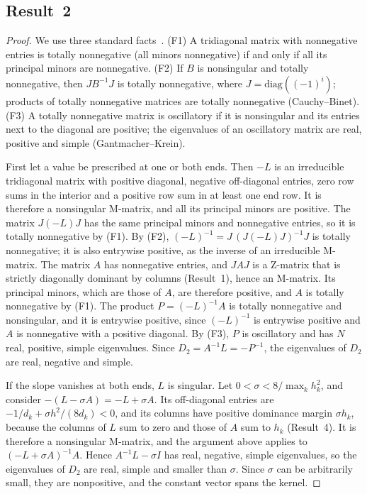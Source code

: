 \documentclass[11pt]{article}
\begin{document}
\subsection*{Result~2}
\begin{proof}
We use three standard facts~\cite{gantmacher2002oscillation,fallat2011totally}. (F1) A tridiagonal matrix
with nonnegative entries is totally nonnegative (all minors nonnegative) if and only if all its principal
minors are nonnegative. (F2) If $B$ is nonsingular and totally nonnegative, then $JB^{-1}J$ is totally
nonnegative, where $J=\mathrm{diag}((-1)^i)$; products of totally nonnegative matrices are totally
nonnegative (Cauchy--Binet). (F3) A totally nonnegative matrix is oscillatory if it is nonsingular and its
entries next to the diagonal are positive; the eigenvalues of an oscillatory matrix are real, positive and
simple (Gantmacher--Krein).

First let a value be prescribed at one or both ends. Then $-L$ is an irreducible tridiagonal matrix with
positive diagonal, negative off-diagonal entries, zero row sums in the interior and a positive row sum
in at least one end row. It is therefore a nonsingular M-matrix, and all its principal minors are positive.
The matrix $J(-L)J$ has the same principal minors and nonnegative entries, so it is totally nonnegative by
(F1). By (F2), $(-L)^{-1}=J\,(J(-L)J)^{-1}J$ is totally nonnegative; it is also entrywise positive, as the
inverse of an irreducible M-matrix. The matrix $A$ has nonnegative entries, and $JAJ$ is a Z-matrix that is
strictly diagonally dominant by columns (Result~1), hence an M-matrix. Its principal minors,
which are those of $A$, are therefore positive, and $A$ is totally nonnegative by (F1). The product
$P=(-L)^{-1}A$ is totally nonnegative and nonsingular, and it is entrywise positive, since $(-L)^{-1}$ is
entrywise positive and $A$ is nonnegative with a positive diagonal. By (F3), $P$ is oscillatory and has $N$
real, positive, simple eigenvalues. Since $D_2=A^{-1}L=-P^{-1}$, the eigenvalues of $D_2$ are real,
negative and simple.

If the slope vanishes at both ends, $L$ is singular. Let
$0<\sigma<8/\max_kh_k^2$, and consider $-(L-\sigma A)=-L+\sigma A$. Its off-diagonal entries are
$-1/d_k+\sigma h^2/(8d_k)<0$, and its columns have positive dominance margin $\sigma h_k$, because the columns
of $L$ sum to zero and those of $A$ sum to $h_k$ (Result~4). It is therefore a nonsingular
M-matrix, and the argument above applies to $(-L+\sigma A)^{-1}A$. Hence $A^{-1}L-\sigma I$ has real,
negative, simple eigenvalues, so the eigenvalues of $D_2$ are real, simple and smaller than $\sigma$. Since
$\sigma$ can be arbitrarily small, they are nonpositive, and the constant vector spans the kernel.
\end{proof}
\end{document}
